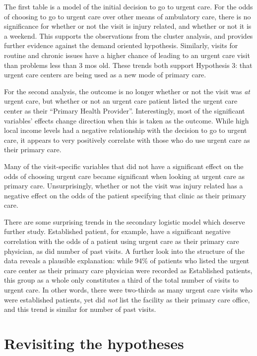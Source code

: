 \documentclass[12pt,twoside]{reedthesis}
\begin{document}
  \doublespacing
  
  The first table is a model of the initial decision to go to urgent care.
  For the odds of choosing to go to urgent care over other means of
  ambulatory care, there is no significance for whether or not the visit
  is injury related, and whether or not it is a weekend. This supports the
  observations from the cluster analysis, and provides further evidence
  against the demand oriented hypothesis. Similarly, visits for routine
  and chronic issues have a higher chance of leading to an urgent care
  visit than problems less than 3 mos old. These trends both support
  Hypothesis 3: that urgent care centers are being used as a new mode of
  primary care.
  
  For the second analysis, the outcome is no longer whether or not the
  visit was \emph{at} urgent care, but whether or not an urgent care
  patient listed the urgent care center as their ``Primary Health
  Provider''. Interestingly, most of the significant variables' effects
  change direction when this is taken as the outcome. While high local
  income levels had a negative relationship with the decision to go to
  urgent care, it appears to very positively correlate with those who do
  use urgent care as their primary care.
  
  Many of the visit-specific variables that did not have a significant
  effect on the odds of choosing urgent care became significant when
  looking at urgent care as primary care. Unsurprisingly, whether or not
  the visit was injury related has a negative effect on the odds of the
  patient specifying that clinic as their primary care.
  
  There are some surprising trends in the secondary logistic model which
  deserve further study. Established patient, for example, have a
  significant negative correlation with the odds of a patient using urgent
  care as their primary care physician, as did number of past visits. A
  further look into the structure of the data reveals a plausible
  explanation: while 94\% of patients who listed the urgent care center as
  their primary care physician were recorded as Established patients, this
  group as a whole only constitutes a third of the total number of visits
  to urgent care. In other words, there were two-thirds as many urgent
  care visits who were established patients, yet did \emph{not} list the
  facility as their primary care office, and this trend is similar for
  number of past visits.
  
  \section*{Revisiting the hypotheses}\label{revisiting-the-hypotheses}
  
\end{document}
